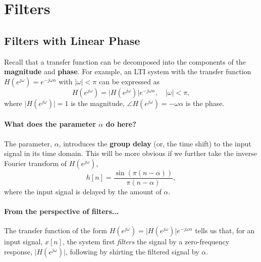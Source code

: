 \section{Filters}

\subsection{Filters with Linear Phase}
Recall that a transfer function can be decomposed into the components of the \textbf{magnitude} and \textbf{phase}. For example, an LTI system with the transfer function $H(e^{j\omega}) = e^{-j\omega \alpha}$ with $\lvert \omega \rvert < \pi$ can be expressed as
\[
    H(e^{j\omega}) = \lvert H(e^{j\omega}) \rvert e^{-j\omega \alpha}, \quad \lvert \omega \rvert < \pi,
\]
where $\lvert H(e^{j\omega}) \rvert = 1$ is the magnitude, $\angle H(e^{j\omega}) = -\omega \alpha$ is the phase. 

\paragraph{What does the parameter $\alpha$ do here?} The parameter, $\alpha$, introduces the \textbf{group delay} (or, the time shift) to the input signal in its time domain. This will be more obvious if we further take the inverse Fourier transform of $H(e^{j\omega})$,
\[
    h[n] = \frac{\sin \left (\pi(n-\alpha) \right)}{\pi(n-\alpha)},
\]
where the input signal is delayed by the amount of $\alpha$.

\paragraph{From the perspective of filters...} The transfer function of the form $H(e^{j\omega}) = \lvert H(e^{j\omega}) \rvert e^{-j\omega \alpha}$ tells us that, for an input signal, $x[n]$, the system first \textit{filters} the signal by a zero-frequency response, $\lvert H(e^{j\omega}) \rvert$, following by shirting the filtered signal by $\alpha$. 

